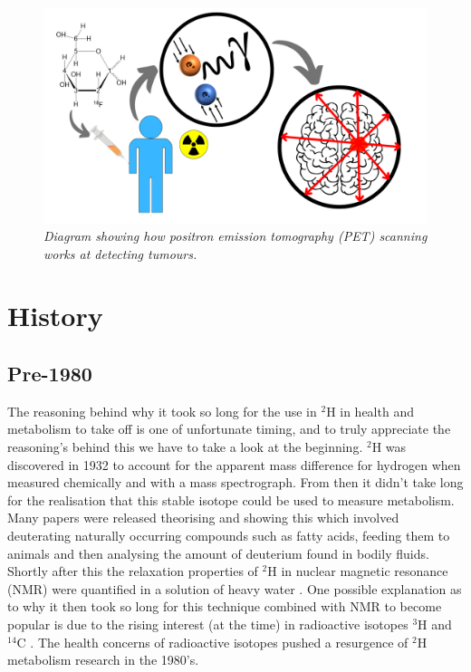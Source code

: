 \documentclass[class=article, crop=false]{standalone}
\begin{document}
\begin{figure}
    \centering
    \includegraphics[width=1\textwidth]{Figures/Intro/PET_Scan.png}
    \caption{\textit{Diagram showing how positron emission tomography (PET) scanning works at detecting tumours.}}
    \label{fig:intro:PET}
\end{figure}

\section{History}

\subsection{Pre-1980}

The reasoning behind why it took so long for the use in $^2$H in health and metabolism to take off is one of unfortunate timing, and to truly appreciate the reasoning's behind this we have to take a look at the beginning. $^2$H was discovered in 1932 \cite{Urey1932AConcentration} to account for the apparent mass difference for hydrogen when measured chemically and with a mass spectrograph. From then it didn't take long for the realisation that this stable isotope could be used to measure metabolism. Many papers were released theorising and showing this \cite{Schoenheimer1935DeuteriumMetabolism,Schoenheimer1938TheMetabolism} which involved deuterating naturally occurring compounds such as fatty acids, feeding them to animals and then analysing the amount of deuterium found in bodily fluids. Shortly after this the relaxation properties of $^2$H in nuclear magnetic resonance (NMR) were quantified in a solution of heavy water \cite{Bloembergen1948RelaxationAbsorption}. One possible explanation as to why it then took so long for this technique combined with NMR to become popular is due to the rising interest (at the time) \cite{DeFeyter2021DeuteriumFuture} in radioactive isotopes $^3$H \cite{Thompson1953StudiesRat} and $^{14}$C \cite{Turteltaub1990AcceleratorDNA.}. The health concerns of radioactive isotopes pushed a resurgence of $^2$H metabolism research in the 1980's.
\end{document}
